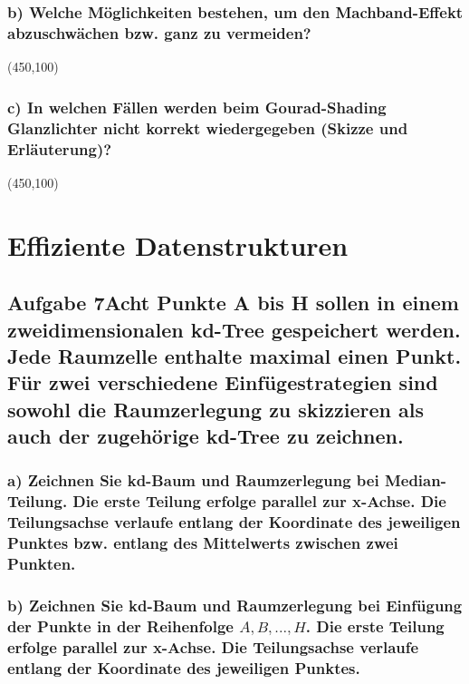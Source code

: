 \documentclass[10pt, a4paper]{article}
\begin{document}
\subsubsection{b) Welche Möglichkeiten bestehen, um den Machband-Effekt abzuschwächen bzw. ganz zu vermeiden?}
\begin{center}
    \framebox(450,100){}
\end{center}
\subsubsection{c) In welchen Fällen werden beim Gourad-Shading Glanzlichter nicht korrekt wiedergegeben (Skizze und Erläuterung)?}
\begin{center}
    \framebox(450,100){}
\end{center}

\section{Effiziente Datenstrukturen}
\subsection{Aufgabe 7\newline Acht Punkte A bis H sollen in einem zweidimensionalen kd-Tree gespeichert werden. Jede Raumzelle enthalte maximal einen Punkt. Für zwei verschiedene Einfügestrategien sind sowohl die Raumzerlegung zu skizzieren als auch der zugehörige kd-Tree zu zeichnen.}
\subsubsection{a) Zeichnen Sie kd-Baum und Raumzerlegung bei Median-Teilung. Die erste Teilung erfolge parallel zur x-Achse. Die Teilungsachse verlaufe entlang der Koordinate des jeweiligen Punktes bzw. entlang des Mittelwerts zwischen zwei Punkten.}
\subsubsection{b) Zeichnen Sie kd-Baum und Raumzerlegung bei Einfügung der Punkte in der Reihenfolge $A,B,...,H$. Die erste Teilung erfolge parallel zur x-Achse. Die Teilungsachse verlaufe entlang der Koordinate des jeweiligen Punktes.}
\end{document}
